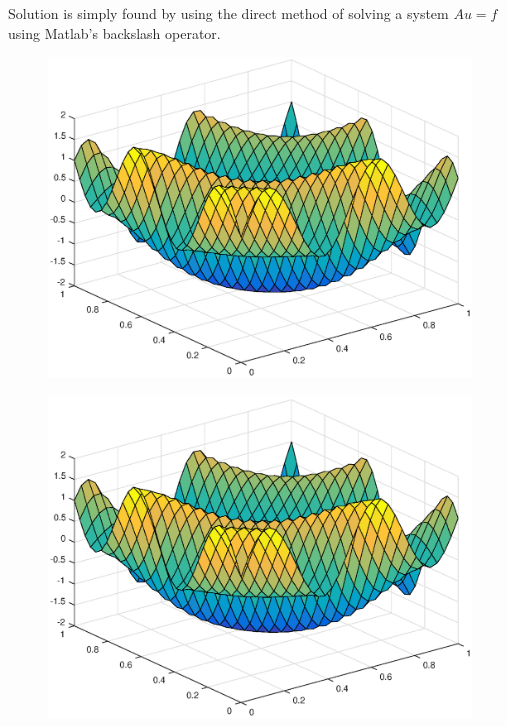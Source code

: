 \documentclass[main.tex]{subfiles}
\begin{document}
Solution is simply found by using the direct method of solving a system $A u = f$ using Matlab's backslash operator.

\begin{figure}[h]
\centering
\begin{minipage}{.5\textwidth}
  \centering
  \includegraphics[width=.9\linewidth]{../Figures/ex2u0exact}
  \label{fig:ex2:u0exact}
\end{minipage}%
\begin{minipage}{.5\textwidth}
  \centering
  \includegraphics[width=.9\linewidth]{../Figures/ex2u0calc}
  \label{fig:ex2:u0calc}
\end{minipage}
\end{figure}
\end{document}
